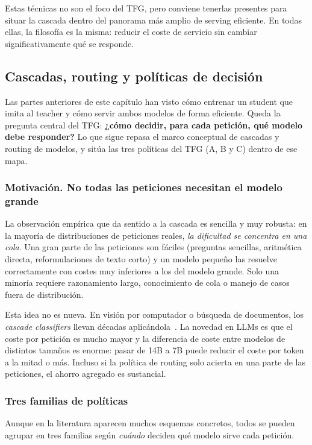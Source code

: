 \documentclass[11pt,a4paper]{article}
\begin{document}
Estas técnicas no son el foco del TFG, pero conviene tenerlas presentes para situar la cascada dentro del panorama más amplio de serving eficiente. En todas ellas, la filosofía es la misma: reducir el coste de servicio sin cambiar significativamente qué se responde.

\subsection{Cascadas, routing y políticas de decisión}

Las partes anteriores de este capítulo han visto cómo entrenar un student que imita al teacher y cómo servir ambos modelos de forma eficiente. Queda la pregunta central del TFG: \textbf{¿cómo decidir, para cada petición, qué modelo debe responder?} Lo que sigue repasa el marco conceptual de cascadas y routing de modelos, y sitúa las tres políticas del TFG (A, B y C) dentro de ese mapa.

\subsubsection{Motivación. No todas las peticiones necesitan el modelo grande}

La observación empírica que da sentido a la cascada es sencilla y muy robusta: en la mayoría de distribuciones de peticiones reales, \textit{la dificultad se concentra en una cola}. Una gran parte de las peticiones son fáciles (preguntas sencillas, aritmética directa, reformulaciones de texto corto) y un modelo pequeño las resuelve correctamente con costes muy inferiores a los del modelo grande. Solo una minoría requiere razonamiento largo, conocimiento de cola o manejo de casos fuera de distribución.

Esta idea no es nueva. En visión por computador o búsqueda de documentos, los \textit{cascade classifiers} llevan décadas aplicándola~\cite{viola2001cascade}. La novedad en LLMs es que el coste por petición es mucho mayor y la diferencia de coste entre modelos de distintos tamaños es enorme: pasar de 14B a 7B puede reducir el coste por token a la mitad o más. Incluso si la política de routing solo acierta en una parte de las peticiones, el ahorro agregado es sustancial.

\subsubsection{Tres familias de políticas}

Aunque en la literatura aparecen muchos esquemas concretos, todos se pueden agrupar en tres familias según \textit{cuándo} deciden qué modelo sirve cada petición.
\end{document}
